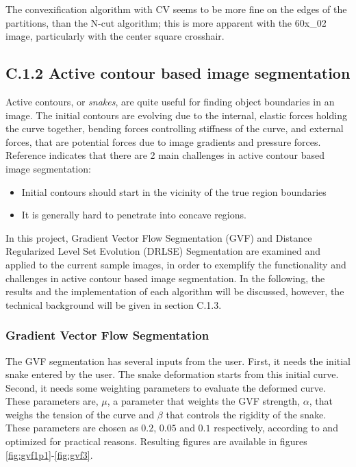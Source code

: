 \documentclass{article}
\begin{document}
The convexification algorithm with CV seems to be more fine on the edges of the partitions, than the N-cut algorithm; this is more apparent with the 60x\_02 image, particularly with the center square crosshair.






\pagebreak
\subsection*{C.1.2 Active contour based image segmentation}
Active contours, or \emph{snakes}, are quite useful for finding object boundaries in an image. The initial contours are evolving due to the internal, elastic forces holding the curve together, bending forces controlling stiffness of the curve, and external forces, that are potential forces due to image gradients and pressure forces. Reference \cite{gvf} indicates that there are 2 main challenges in active contour based image segmentation:
\begin{itemize}
\item Initial contours should start in the vicinity of the true region boundaries
\item It is generally hard to penetrate into concave regions.
\end{itemize}
In this project, Gradient Vector Flow Segmentation (GVF) \cite{gvf} and Distance Regularized Level Set Evolution (DRLSE) Segmentation \cite{drlse} are examined and applied to the current sample images, in order to exemplify the functionality and challenges in active contour based image segmentation. In the following, the results and the implementation of each algorithm will be discussed, however, the technical background will be given in section C.1.3. 


\subsubsection*{Gradient Vector Flow Segmentation}
The GVF segmentation has several inputs from the user. First, it needs the initial snake entered by the user. The snake deformation starts from this initial curve. Second, it needs some weighting parameters to evaluate the deformed curve. These parameters are, $\mu$, a parameter that weights the GVF strength, $\alpha$, that weighs the tension of the curve and $\beta$ that controls the rigidity of the snake. These parameters are chosen as $0.2$, $0.05$ and $0.1$ respectively, according to \cite{gvf} and optimized for practical reasons. Resulting figures are available in figures \ref{fig:gvf1p1}-\ref{fig:gvf3}.
\end{document}
